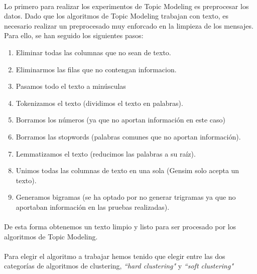 \documentclass{report}
\begin{document}
                \paragraph*{}{
                    Lo primero para realizar los experimentos de Topic Modeling es preprocesar los datos.
                    Dado que los algoritmos de Topic Modeling trabajan con texto, es necesario realizar un preprocesado muy enforcado en la limpieza de los mensajes.
                    Para ello, se han seguido los siguientes pasos:
                }
                \begin{enumerate}
                    \item Eliminar todas las columnas que no sean de texto.
                    \item Eliminarmos las filas que no contengan informacion.
                    \item Pasamos todo el texto a minúsculas
                    \item Tokenizamos el texto (dividimos el texto en palabras).
                    \item Borramos los números (ya que no aportan información en este caso)
                    \item Borramos las stopwords (palabras comunes que no aportan información).
                    \item Lemmatizamos el texto (reducimos las palabras a su raíz).
                    \item Unimos todas las columnas de texto en una sola (Gensim solo acepta un texto).
                    \item Generamos bigramas (se ha optado por no generar trigramas ya que no aportaban información en las pruebas realizadas).
                \end{enumerate}
                \paragraph*{}{
                    De esta forma obtenemos un texto limpio y listo para ser procesado por los algoritmos de Topic Modeling.
                }
                \paragraph*{}
                {
                    Para elegir el algoritmo a trabajar hemos tenido que elegir entre las dos categorías de algoritmos de clustering, \textit{``hard clustering"} y \textit{``soft clustering"}
                }
\end{document}
